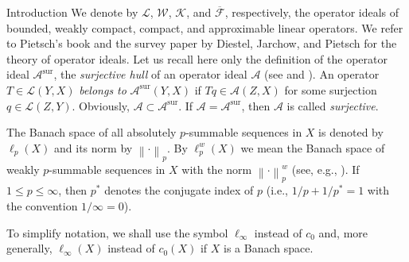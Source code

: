\documentclass[a4paper,11pt]{amsart}
\theoremstyle{definition}
\theoremstyle{definition}
\theoremstyle{definition}
\begin{document}
\begin{section}{Introduction}
We denote by ${{\mathcal L}}$, ${{\mathcal W}}$, ${{\mathcal K}}$, and $\overline {{\mathcal F}}$, respectively, the operator ideals  of bounded, weakly compact, compact, and approximable linear operators. We refer to Pietsch's book \cite{P} and the survey paper \cite{DJP} by Diestel, Jarchow, and Pietsch for the theory of operator ideals. Let us recall here only the definition of the operator ideal ${{\mathcal A}}^\mathrm{sur}$, the \emph{surjective hull} of an operator ideal ${{\mathcal A}}$ (see \cite[Section~2]{S73} and \cite[4.7.1]{P}). An operator $T\in {{\mathcal L}}(Y,X)$ \emph{belongs to} ${{\mathcal A}}^\mathrm{sur}(Y,X)$ if $Tq \in {{\mathcal A}}(Z,X)$ for some surjection $q\in{{\mathcal L}} (Z,Y)$. Obviously, ${{\mathcal A}} \subset {{\mathcal A}}^\mathrm{sur}$. If ${{\mathcal A}} = {{\mathcal A}} ^\mathrm{sur}$, then ${{\mathcal A}}$ is called \emph{surjective}.

The Banach space of all absolutely $p$-summable sequences in $X$ is denoted by $\ell_p(X)$ and its norm by ${\left\lVert {\cdot} \right\rVert}_p$. By $\ell_p ^w (X)$ we mean the Banach space of weakly $p$-summable sequences in $X$ with the norm ${\left\lVert {\cdot} \right\rVert}_p^w$ (see, e.g., \cite[pp. 32--33]{DJT}). If $1\leq p \leq \infty$, then ${p^{\ast}}$ denotes the conjugate index of $p$ (i.e., $1/p + 1/{p^{\ast}} =1$ with the convention $ 1/ \infty =0$).

To simplify notation, we shall use the symbol $\ell_\infty$ instead of $c_0$ and, more generally, $\ell_\infty (X)$ instead of $c_0(X)$ if $X$ is a Banach space.
\end{section}
\end{document}
